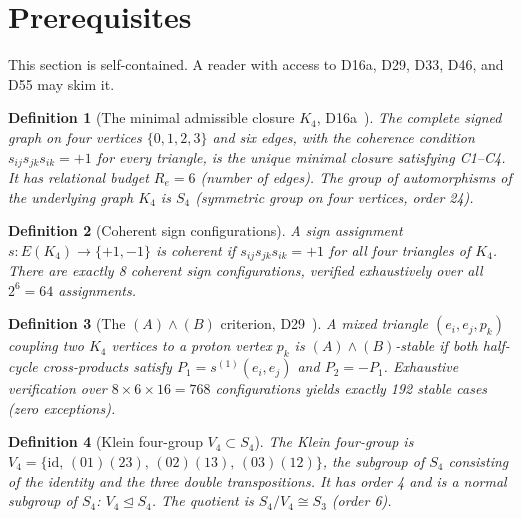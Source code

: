\documentclass[11pt,a4paper]{article}
\newtheorem{definition}{Definition}[section]
\newcommand{\Kfour}{K_4}
\newcommand{\Retot}{R_e}
\begin{document}
\section{Prerequisites}
\label{sec:prereq}

This section is self-contained. A reader with access to D16a, D29, D33, D46, and D55 may skim it.

\begin{definition}[The minimal admissible closure $\Kfour$, D16a~\cite{PDL_D16a}]
\label{def:K4}
The complete signed graph on four vertices $\{0,1,2,3\}$ and six edges, with the coherence condition $s_{ij}s_{jk}s_{ik} = +1$ for every triangle, is the unique minimal closure satisfying C1--C4. It has relational budget $\Retot = 6$ (number of edges). The group of automorphisms of the underlying graph $K_4$ is $S_4$ (symmetric group on four vertices, order 24).
\end{definition}

\begin{definition}[Coherent sign configurations]
\label{def:coherent}
A sign assignment $s : E(\Kfour) \to \{+1,-1\}$ is \emph{coherent} if $s_{ij}s_{jk}s_{ik} = +1$ for all four triangles of $\Kfour$. There are exactly 8 coherent sign configurations, verified exhaustively over all $2^6 = 64$ assignments.
\end{definition}

\begin{definition}[The $(A)\wedge(B)$ criterion, D29~\cite{PDL_D29}]
\label{def:AB}
A mixed triangle $(e_i, e_j, p_k)$ coupling two $\Kfour$ vertices to a proton vertex $p_k$ is \emph{$(A)\wedge(B)$-stable} if both half-cycle cross-products satisfy $P_1 = s^{(1)}(e_i,e_j)$ and $P_2 = -P_1$. Exhaustive verification over $8 \times 6 \times 16 = 768$ configurations yields exactly 192 stable cases (zero exceptions).
\end{definition}

\begin{definition}[Klein four-group $V_4 \subset S_4$]
\label{def:V4}
The Klein four-group is $V_4 = \{\mathrm{id},\, (01)(23),\, (02)(13),\, (03)(12)\}$, the subgroup of $S_4$ consisting of the identity and the three double transpositions. It has order 4 and is a normal subgroup of $S_4$: $V_4 \trianglelefteq S_4$. The quotient is $S_4/V_4 \cong S_3$ (order 6).
\end{definition}
\end{document}
